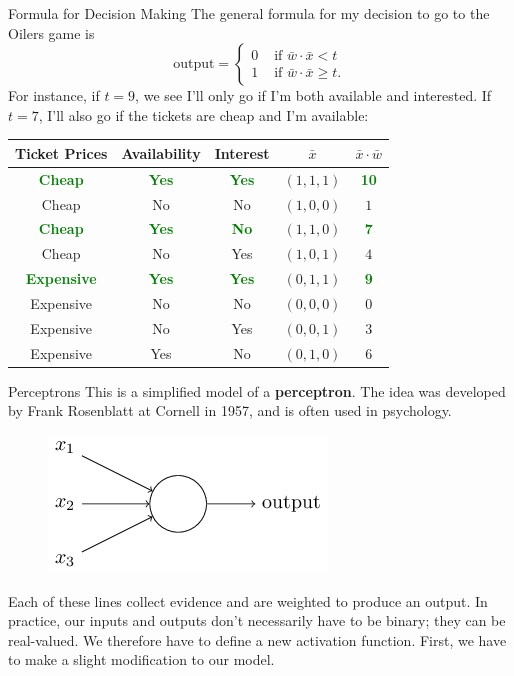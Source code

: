 \documentclass[xcolor=dvipsnames, fontsize=11pt, %
pagesize, %
parskip=half-, t]{beamer}
\begin{document}
\begin{frame}{Formula for Decision Making}
The general formula for my decision to go to the Oilers game is $$\text{output}=\begin{cases} 0 & \text{ if } \bar{w}\cdot \bar{x}<t \\ 
1 & \text{ if } \bar{w}\cdot \bar{x}\ge t. \end{cases}$$ \pause 
For instance, if $t=9$, we see I'll only go if I'm both available and interested. \pause If $t=7$, I'll also go if the tickets are cheap and I'm available:
\begin{table} 
\center 
\begin{tabular}{cccc|c}
Ticket Prices & Availability & Interest & $\bar{x}$ & $\bar{x}\cdot \bar{w}$ \\ \hline 
\textbf{\textcolor{Green}{Cheap}} & \textbf{\textcolor{Green}{Yes}} & \textbf{\textcolor{Green}{Yes}} & $(1,1,1)$ & \textbf{\textcolor{Green}{10}} \\
Cheap & No & No & $(1,0,0)$ & $1$ \\
\textbf{\textcolor{Green}{Cheap }}& \textbf{\textcolor{Green}{Yes }}& \textbf{\textcolor{Green}{No}} & $(1,1,0)$ & \textbf{\textcolor{Green}{7}} \\
Cheap & No & Yes & $(1,0,1)$ & $4$   \\
\textbf{\textcolor{Green}{Expensive}} & \textbf{\textcolor{Green}{Yes}} & \textbf{\textcolor{Green}{Yes}} & $(0,1,1)$ & \textbf{\textcolor{Green}{9}} \\
Expensive & No & No & $(0,0,0)$  & $0$ \\
Expensive & No & Yes & $(0,0,1)$ & $3$\\
Expensive & Yes & No & $(0,1,0)$ & $6$
\end{tabular}
\end{table}
\end{frame}
\begin{frame}{Perceptrons}
This is a simplified model of a \textbf{perceptron}. The idea was developed by Frank Rosenblatt at Cornell in 1957, and is often used in psychology. \pause 

\begin{figure}
\center
\includegraphics[scale=0.75]{perc.png}
\end{figure} \pause
\vspace{0.05\textheight} 
Each of these lines collect evidence and are weighted to produce an output. \pause In practice, our inputs and outputs don't necessarily have to be binary; they can be real-valued. We therefore have to define a new activation function. \pause First, we have to make a slight modification to our model.
\end{frame}
\end{document}
